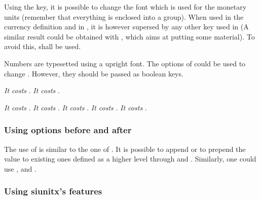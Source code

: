 \documentclass[12pt,add-index]{cnltx-doc}
\begin{document}
Using the  key, it is possible to change the font which 
is used for the monetary units (remember that everything is enclosed into a group). 
When used in the currency definition and in , 
it is however supersed by any other  key used in 
(A similar result could be obtained with , which aims
at putting some material). To avoid this,  shall be used.

Numbers are typesetted using a upright font. The 
options of  could be used to change \cite[\S~5.2]{siunitx}.
However, they should be passed as boolean keys. 


\begin{example}
    \textit{It costs }.
    \textit{It costs }.
    \begin{empty}
    \textit{It costs }.
    \textit{It costs }.
    \textit{It costs }.
    \textit{It costs }.
    \textit{It costs }.
    \end{empty}
\end{example}

\subsubsection{Using options before and after}

The use of  is similar to the one of .
It is possible to append or to prepend the value to existing ones
defined as a higher level through  and .
Similarly, one could use ,  and .

\begin{example}
\end{example}

\subsubsection{Using siunitx's features}
\end{document}
